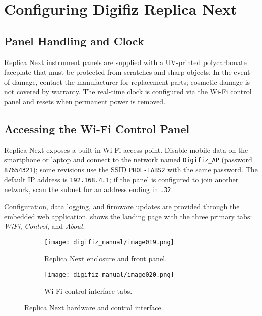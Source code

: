 \chapter{Configuring Digifiz Replica Next} \label{ch:Features}

\section{Panel Handling and Clock}

Replica Next instrument panels are supplied with a UV-printed polycarbonate faceplate that must be protected from scratches and sharp objects.
In the event of damage, contact the manufacturer for replacement parts; cosmetic damage is not covered by warranty.
The real-time clock is configured via the Wi-Fi control panel and resets when permanent power is removed.

\section{Accessing the Wi-Fi Control Panel}

Replica Next exposes a built-in Wi-Fi access point.
Disable mobile data on the smartphone or laptop and connect to the network named \texttt{Digifiz\_AP} (password \texttt{87654321}); some revisions use the SSID \texttt{PHOL-LABS2} with the same password.
The default IP address is \texttt{192.168.4.1}; if the panel is configured to join another network, scan the subnet for an address ending in \texttt{.32}.

Configuration, data logging, and firmware updates are provided through the embedded web application.
 shows the landing page with the three primary tabs: \emph{WiFi}, \emph{Control}, and \emph{About}.

\begin{figure}[htbp]
    \centering
    \begin{subfigure}{0.48\textwidth}
        \texttt{[image: digifiz\_manual/image019.png]}
        \caption{Replica Next enclosure and front panel.}
    \end{subfigure}\hfill
    \begin{subfigure}{0.48\textwidth}
        \texttt{[image: digifiz\_manual/image020.png]}
        \caption{Wi-Fi control interface tabs.}
    \end{subfigure}
    \caption{Replica Next hardware and control interface.}
    \label{fig:next-control-tabs}
\end{figure}

